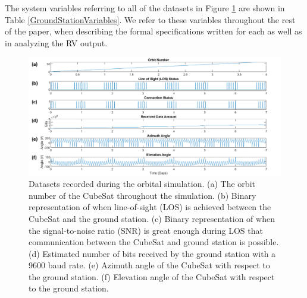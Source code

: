 \documentclass[conf]{new-aiaa}
\begin{document}
The system variables referring to all of the datasets in Figure \ref{OrbitalDatasets} are shown in Table \ref{GroundStationVariables}. We refer to these variables throughout the rest of the paper, when describing the formal specifications written for each as well as in analyzing the RV output.

\begin{figure}[!ht]
\centering
\includegraphics[width=1\textwidth]{Fig/OrbitSimulationDataUpdated5.png}
\caption{Datasets recorded during the orbital simulation. (a) The orbit number of the CubeSat throughout the simulation. (b) Binary representation of when line-of-sight (LOS) is achieved between the CubeSat and the ground station. (c) Binary representation of when the signal-to-noise ratio (SNR) is great enough during LOS that communication between the CubeSat and ground station is possible. (d) Estimated number of bits received by the ground station with a 9600 baud rate. (e) Azimuth angle of the CubeSat with respect to the ground station. (f) Elevation angle of the CubeSat with respect to the ground station.}
\label{OrbitalDatasets}
\end{figure}

\vspace{15 mm}
\end{document}
